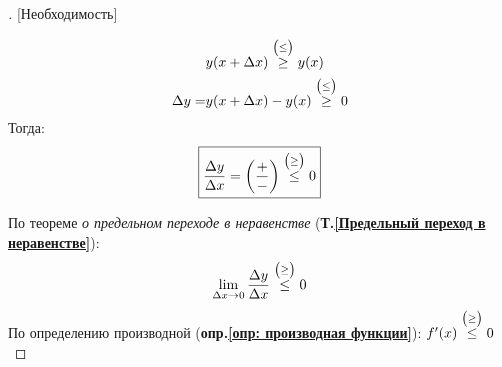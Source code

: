 \begin{proof}[][Необходимость]
\begin{enumerate}
          \begin{align*}
            & y(x+\Delta x) \overset{\scriptsize{\big(\le \big)}}{\ge} y(x) \\
            \Delta y = & y(x + \Delta x) - y(x) \overset{\scriptsize{\big(\le \big)}}{\ge} 0
          \end{align*} \vspace{-\topsep}
          Тогда:
          \begin{gather*}
            \boxed{\frac{\Delta y}{\Delta x} = \left(\frac{+}{-}\right) \overset{\scriptsize{\big(\ge \big)}}{\le} 0}
          \end{gather*}
	\end{enumerate}
	По теореме \textit{о предельном переходе в неравенстве} (\textbf{Т.\ref{Предельный переход в неравенстве}}):
	\begin{gather*}
		\lim\limits_{\Delta x \to 0} \frac{\Delta y}{\Delta x} \overset{\scriptsize{\big(\ge \big)}}{\le} 0
	\end{gather*}
	По определению производной (\textbf{опр.\ref{опр: производная функции}}): $f'(x) \overset{\scriptsize{\big(\ge \big)}}{\le} 0$
\end{proof}
